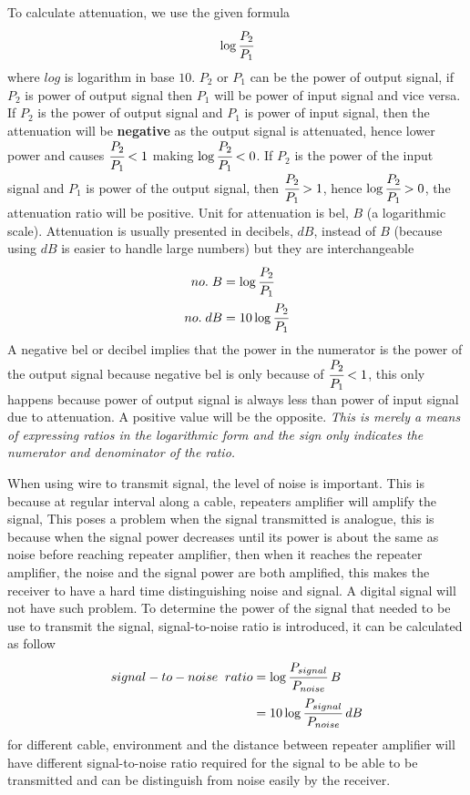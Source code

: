 \documentclass{article}
\begin{document}
To calculate attenuation, we use the given formula 
$$\log \cfrac{P_2}{P_1}$$
where $log$ is logarithm in base $10$. $P_2$ or $P_1$ can be the power of output signal, if $P_2$ is power of output signal then $P_1$ will be power of input signal and vice versa. If $P_2$ is the power of output signal and $P_1$ is power of input signal, then the attenuation will be \textbf{negative} as the output signal is attenuated, hence lower power and causes $\cfrac{P_2}{P_1}<1$ making $\log \cfrac{P_2}{P_1}<0$. If $P_2$ is the power of the input signal and $P_1$ is power of the output signal, then $\cfrac{P_2}{P_1}>1$, hence $\log \cfrac{P_2}{P_1}>0$, the attenuation ratio will be positive. Unit for attenuation is bel, $B$ (a logarithmic scale). Attenuation is usually presented in decibels, $dB$, instead of $B$ (because using $dB$ is easier to handle large numbers) but they are interchangeable
\begin{align*}
    no. \;B&=\log \cfrac{P_2}{P_1}\\
    no. \; dB&=10\log \cfrac{P_2}{P_1}
\end{align*}
A negative bel or decibel implies that the power in the numerator is the power of the output signal because negative bel is only because of $\cfrac{P_2}{P_1}<1$, this only happens because power of output signal is always less than power of input signal due to attenuation. A positive value will be the opposite. \textit{This is merely a means of expressing ratios in the logarithmic form and the sign only indicates the numerator and denominator of the ratio.}

When using wire to transmit signal, the level of noise is important. This is because at regular interval along a cable, repeaters amplifier will amplify the signal, This poses a problem when the signal transmitted is analogue, this is because when the signal power decreases until its power is about the same as noise before reaching repeater amplifier, then when it reaches the repeater amplifier, the noise and the signal power are both amplified, this makes the receiver to have a hard time distinguishing noise and signal. A digital signal will not have such problem. To determine the power of the signal that needed to be use to transmit the signal, signal-to-noise ratio is introduced, it can be calculated as follow 
\begin{align*}
signal-to-noise \;\; ratio&=\log \cfrac{P_{signal}}{P_{noise}}\;B\\
&=10\log \cfrac{P_{signal}}{P_{noise}}\; dB
\end{align*}
for different cable, environment and the distance between repeater amplifier will have different signal-to-noise ratio required for the signal to be able to be transmitted and can be distinguish from noise easily by the receiver.
\end{document}
